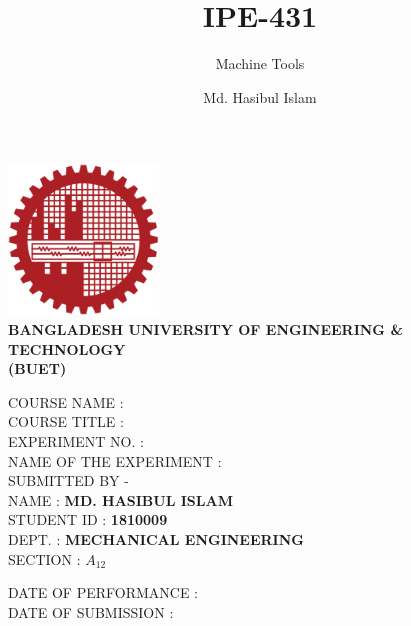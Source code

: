 \documentclass[14pt]{article} %
\title{IPE-431}
\author{Md. Hasibul Islam}
\subtitle{Machine Tools}
\date{}
\begin{document}
\begin{titlepage}
    \centering
    \includegraphics[width=4cm]{institution_logo.jpg}\\
    \vspace*{1cm}
    \textbf{\MakeTextUppercase{Bangladesh University of Engineering \& Technology}} \\

    \textbf{\MakeTextUppercase{(BUET)}} \\
    \vspace*{2cm}
    \raggedright
    \MakeTextUppercase{Course Name} : \\
    \vspace*{0.5cm}
    \MakeTextUppercase{Course Title} : \\
    \vspace*{1cm}
    \MakeTextUppercase{Experiment No.} :\\
    \vspace*{0.5cm}
    \MakeTextUppercase{Name of the Experiment} :\\
    \vspace*{3.5cm} 
    \MakeTextUppercase{Submitted By -} \\
    \vspace*{0.5cm}
    \MakeTextUppercase{Name}        : \hspace{2cm}\textbf{MD. HASIBUL ISLAM} \\
    \vspace*{0.5cm}
    \MakeTextUppercase{Student id}  : \hspace{1cm}\textbf{1810009} \\
    \vspace*{0.5cm}
    \MakeTextUppercase{Dept.}       : \hspace{2cm}\textbf{MECHANICAL ENGINEERING} \\
    \vspace*{0.5cm}
    \MakeTextUppercase{section}     : \hspace{1.5cm}\textbf{$A_{12}$} \\

    \vspace*{2cm}

    \MakeTextUppercase{Date of Performance}     :\\
    \vspace*{0.5cm}
    \MakeTextUppercase{Date of Submission}      :\\

    \vfill
\end{titlepage}
\end{document}
